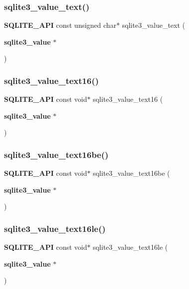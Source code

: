 \subsubsection{sqlite3\_value\_text()}
{\footnotesize\ttfamily \textbf{ S\+Q\+L\+I\+T\+E\+\_\+\+A\+PI} const unsigned char$\ast$ sqlite3\+\_\+value\+\_\+text (\begin{DoxyParamCaption}\item[{\textbf{ sqlite3\+\_\+value} $\ast$}]{ }\end{DoxyParamCaption})}

\mbox{\label{sqlite3_8h_ae934ba629bb0e085a2de4802990f00d1}} 
\subsubsection{sqlite3\_value\_text16()}
{\footnotesize\ttfamily \textbf{ S\+Q\+L\+I\+T\+E\+\_\+\+A\+PI} const void$\ast$ sqlite3\+\_\+value\+\_\+text16 (\begin{DoxyParamCaption}\item[{\textbf{ sqlite3\+\_\+value} $\ast$}]{ }\end{DoxyParamCaption})}

\mbox{\label{sqlite3_8h_af229071bebf3bca9a34476e439bb2d6f}} 
\subsubsection{sqlite3\_value\_text16be()}
{\footnotesize\ttfamily \textbf{ S\+Q\+L\+I\+T\+E\+\_\+\+A\+PI} const void$\ast$ sqlite3\+\_\+value\+\_\+text16be (\begin{DoxyParamCaption}\item[{\textbf{ sqlite3\+\_\+value} $\ast$}]{ }\end{DoxyParamCaption})}

\mbox{\label{sqlite3_8h_a7077f9814bbfd409d14ed77ea35e5d86}} 
\subsubsection{sqlite3\_value\_text16le()}
{\footnotesize\ttfamily \textbf{ S\+Q\+L\+I\+T\+E\+\_\+\+A\+PI} const void$\ast$ sqlite3\+\_\+value\+\_\+text16le (\begin{DoxyParamCaption}\item[{\textbf{ sqlite3\+\_\+value} $\ast$}]{ }\end{DoxyParamCaption})}

